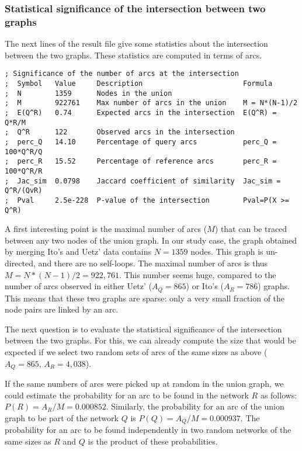 \begin{enumerate}
\subsubsection{Statistical significance of the intersection between two graphs}

The next lines of the result file give some statistics about the
intersection between the two graphs. These statistics are computed in
terms of arcs.

\begin{footnotesize}
\begin{verbatim}
; Significance of the number of arcs at the intersection
;  Symbol   Value     Description                        Formula
;  N        1359      Nodes in the union                    
;  M        922761    Max number of arcs in the union    M = N*(N-1)/2
;  E(Q^R)   0.74      Expected arcs in the intersection  E(Q^R) = Q*R/M
;  Q^R      122       Observed arcs in the intersection
;  perc_Q   14.10     Percentage of query arcs           perc_Q = 100*Q^R/Q
;  perc_R   15.52     Percentage of reference arcs       perc_R = 100*Q^R/R
;  Jac_sim  0.0798    Jaccard coefficient of similarity  Jac_sim = Q^R/(QvR)
;  Pval     2.5e-228  P-value of the intersection        Pval=P(X >= Q^R)
\end{verbatim}
\end{footnotesize}

A first interesting point is the maximal number of arcs ($M$) that can
be traced between any two nodes of the union graph. In our study case,
the graph obtained by merging Ito's and Uetz' data contains $N=1359$
nodes. This graph is un-directed, and there are no self-loops. The
maximal number of arcs is thus $M=N*(N-1)/2=922,761$. This number
seems huge, compared to the number of arcs observed in either Uetz'
($A_Q=865$) or Ito's ($A_R=786$) graphs. This means that these two
graphs are sparse: only a very small fraction of the node pairs are
linked by an arc.

The next question is to evaluate the statistical significance of the
intersection between the two graphs. For this, we can already compute
the size that would be expected if we select two random sets of arcs
of the same sizes as above ($A_Q=865$, $A_R=4,038$). 

If the same numbers of arcs were picked up at random in the union
graph, we could estimate the probability for an arc to be found in the
network $R$ as follows: $P(R) = A_R/M = 0.000852$. Similarly, the
probability for an arc of the union graph to be part of the network
$Q$ is $P(Q) = A_Q/M = 0.000937$.  The probability for an arc to be
found independently in two random networks of the same sizes as $R$
and $Q$ is the product of these probabilities.


\end{enumerate}
